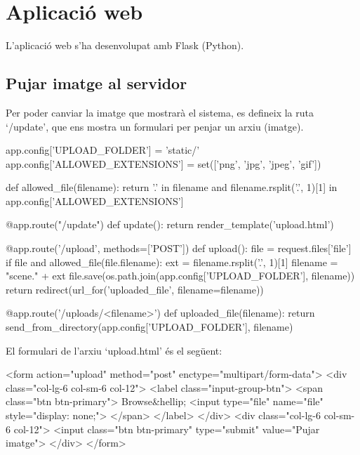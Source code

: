 \section{Aplicació web}
	L'aplicació web s'ha desenvolupat amb Flask (Python).
	\subsection{Pujar imatge al servidor}
		Per poder canviar la imatge que mostrarà el sistema, es defineix la ruta `/update', que ens mostra un formulari per penjar un arxiu (imatge).\\
		\begin{python}
app.config['UPLOAD_FOLDER'] = 'static/'
app.config['ALLOWED_EXTENSIONS'] = set(['png', 'jpg', 'jpeg', 'gif'])


def allowed_file(filename):
	return '.' in filename and 
		filename.rsplit('.', 1)[1] in app.config['ALLOWED_EXTENSIONS']

@app.route("/update")
def update():
	return render_template('upload.html')

@app.route('/upload', methods=['POST'])
def upload():    
	file = request.files['file']
	if file and allowed_file(file.filename):        
		ext = filename.rsplit('.', 1)[1]
		filename = "scene." + ext        
		file.save(os.path.join(app.config['UPLOAD_FOLDER'], filename))
		return redirect(url_for('uploaded_file', filename=filename))

@app.route('/uploads/<filename>')
def uploaded_file(filename):
	return send_from_directory(app.config['UPLOAD_FOLDER'], filename)
		\end{python}

\newpage
\noindent
El formulari de l'arxiu `upload.html' és el següent:\\

		\begin{txt}
<form action="upload" method="post" 
	enctype="multipart/form-data">
	<div class="col-lg-6 col-sm-6 col-12">
		<label class="input-group-btn">
			<span class="btn btn-primary">
				Browse&hellip; <input type="file" 
					name="file" style="display: none;">
			</span>
		</label>
	</div>
	<div class="col-lg-6 col-sm-6 col-12">
		<input class="btn btn-primary" type="submit"
			value="Pujar imatge">
	</div>
</form>
		\end{txt}

